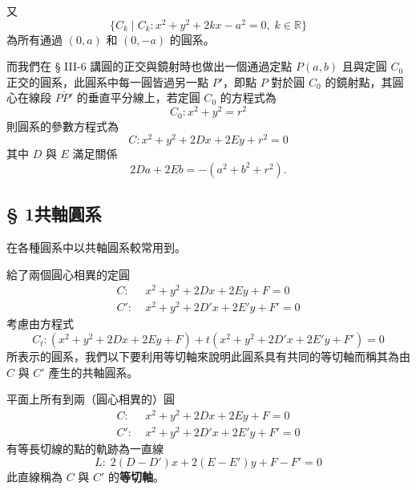 又
\[
\{C_k \mid C_k: x^2+y^2+2kx-a^2=0, \; k \in \mathbb{R}\}
\]
為所有通過 $(0, a)$ 和 $(0, -a)$ 的圓系。

\begin{center}
\end{center}

而我們在 § III-6 講圓的正交與鏡射時也做出一個通過定點 $P(a, b)$ 且與定圓 $C_0$ 正交的圓系，此圓系中每一圓皆過另一點 $P'$，即點 $P$ 對於圓 $C_0$ 的鏡射點，其圓心在線段 $\overline{PP'}$ 的垂直平分線上，若定圓 $C_0$ 的方程式為
\[
C_0: x^2+y^2=r^2
\]
則圓系的參數方程式為
\[
C: x^2+y^2+2Dx+2Ey+r^2=0
\]
其中 $D$ 與 $E$ 滿足關係
\[
2Da+2Eb = -(a^2+b^2+r^2).
\]

\subsection*{§ 1\quad 共軸圓系}

在各種圓系中以共軸圓系較常用到。

給了兩個圓心相異的定圓
\begin{align*}
C:&\; x^2+y^2+2Dx+2Ey+F=0 \\
C':&\; x^2+y^2+2D'x+2E'y+F'=0
\end{align*}
考慮由方程式
\[
C_t: (x^2+y^2+2Dx+2Ey+F) + t(x^2+y^2+2D'x+2E'y+F') = 0
\]
所表示的圓系，我們以下要利用等切軸來說明此圓系具有共同的等切軸而稱其為由 $C$ 與 $C'$ 產生的共軸圓系。

\begin{prop}
平面上所有到兩（圓心相異的）圓
\begin{align*}
C:&\; x^2+y^2+2Dx+2Ey+F=0 \\
C':&\; x^2+y^2+2D'x+2E'y+F'=0
\end{align*}
有等長切線的點的軌跡為一直線
\[
L:\; 2(D-D')x + 2(E-E')y + F-F' = 0
\]
此直線稱為 $C$ 與 $C'$ 的\textbf{等切軸}。
\end{prop}

